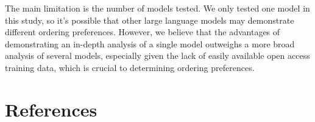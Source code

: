 \documentclass[
  nottoc]{article}
\begin{document}
The main limitation is the number of models tested. We only tested one
model in this study, so it's possible that other large language models
may demonstrate different ordering preferences. However, we believe that
the advantages of demonstrating an in-depth analysis of a single model
outweighs a more broad analysis of several models, especially given the
lack of easily available open access training data, which is crucial to
determining ordering preferences.

\clearpage

\section*{References}\label{references}

\label{refs}
\end{document}
